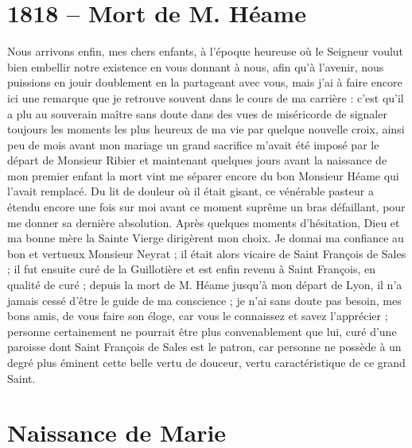 \documentclass[11pt,a4paper]{report}
\begin{document}
\section*{1818 -- Mort de M. Héame}

Nous arrivons enfin, mes chers enfants, à l'époque heureuse où le Seigneur voulut bien embellir notre existence en vous donnant à nous, afin qu'à l'avenir, nous puissions en jouir doublement en la partageant avec vous, mais j'ai à faire encore ici une remarque que je retrouve souvent dans le cours de ma carrière : c'est qu'il a plu au souverain maître sans doute dans des vues de miséricorde de signaler toujours les moments les plus heureux de ma vie par quelque nouvelle croix, ainsi peu de mois avant mon mariage un grand sacrifice m'avait été imposé par le départ de Monsieur Ribier et maintenant quelques jours avant la naissance de mon premier enfant la mort vint me séparer encore du bon Monsieur Héame qui l'avait remplacé. Du lit de douleur où il était gisant, ce vénérable pasteur a étendu encore une fois sur moi avant ce moment suprême un bras défaillant, pour me donner sa dernière absolution. Après quelques moments d'hésitation, Dieu et ma bonne mère la Sainte Vierge dirigèrent mon choix. Je donnai ma confiance au bon et vertueux Monsieur Neyrat ; il était alors vicaire de Saint François de Sales ; il fut ensuite curé de la Guillotière et est enfin revenu à Saint François, en qualité de curé ; depuis la mort de M. Héame jusqu'à mon départ de Lyon, il n'a jamais cessé d'être le guide de ma conscience ; je n'ai sans doute pas besoin, mes bons amis, de vous faire son éloge, car vous le connaissez et savez l'apprécier ; personne certainement ne pourrait être plus convenablement que lui, curé d'une paroisse dont Saint François de Sales est le patron, car personne ne possède à un degré plus éminent cette belle vertu de douceur, vertu caractéristique de ce grand Saint.

\section*{Naissance de Marie}
\end{document}
